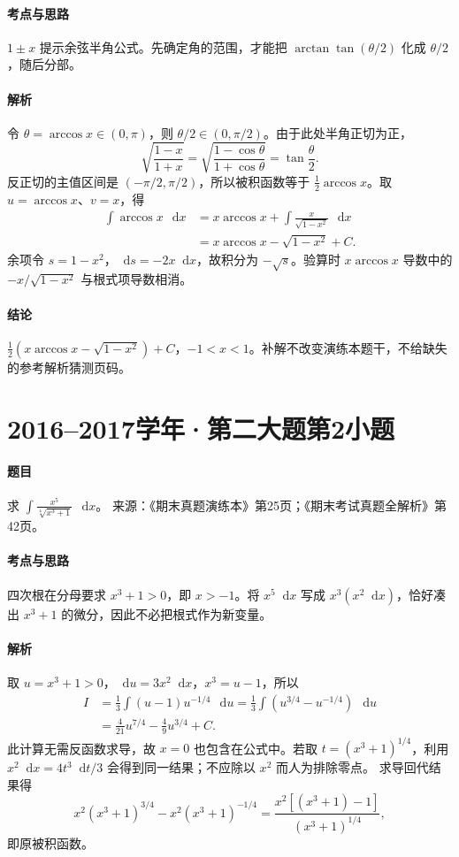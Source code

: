 \documentclass[UTF8,fontset=fandol,12pt,oneside,openany]{ctexrep}
\newcommand{\dd}{\mathop{}\!\mathrm d}
\theoremstyle{definition}
\begin{document}
\paragraph{考点与思路}$1\pm x$ 提示余弦半角公式。先确定角的范围，才能把 $\arctan\tan(\theta/2)$ 化成 $\theta/2$，随后分部。
\paragraph{解析}令 $\theta=\arccos x\in(0,\pi)$，则 $\theta/2\in(0,\pi/2)$。由于此处半角正切为正，
\[
\sqrt{\frac{1-x}{1+x}}
=\sqrt{\frac{1-\cos\theta}{1+\cos\theta}}
=\tan\frac\theta2.
\]
反正切的主值区间是 $(-\pi/2,\pi/2)$，所以被积函数等于 $\frac12\arccos x$。取 $u=\arccos x$、$v=x$，得
\begin{align*}
\int\arccos x\,\dd x
&=x\arccos x+\int\frac{x}{\sqrt{1-x^2}}\,\dd x\\
&=x\arccos x-\sqrt{1-x^2}+C.
\end{align*}
余项令 $s=1-x^2$，$\dd s=-2x\dd x$，故积分为 $-\sqrt{s}$。验算时 $x\arccos x$ 导数中的 $-x/\sqrt{1-x^2}$ 与根式项导数相消。
\paragraph{结论}$\boxed{\frac12\left(x\arccos x-\sqrt{1-x^2}\right)+C}$，$-1<x<1$。补解不改变演练本题干，不给缺失的参考解析猜测页码。

\par\addvspace{18pt}\noindent\begin{minipage}{\linewidth}
\section{2016--2017学年·第二大题第2小题}
\paragraph{题目}求 $\displaystyle\int\frac{x^5}{\sqrt[4]{x^3+1}}\,\dd x$。
来源：《期末真题演练本》第25页；《期末考试真题全解析》第42页。
\end{minipage}\par
\paragraph{考点与思路}四次根在分母要求 $x^3+1>0$，即 $x>-1$。将 $x^5\dd x$ 写成 $x^3(x^2\dd x)$，恰好凑出 $x^3+1$ 的微分，因此不必把根式作为新变量。
\paragraph{解析}取 $u=x^3+1>0$，$\dd u=3x^2\dd x$，$x^3=u-1$，所以
\begin{align*}
I&=\frac13\int(u-1)u^{-1/4}\,\dd u
=\frac13\int(u^{3/4}-u^{-1/4})\,\dd u\\
&=\frac4{21}u^{7/4}-\frac49u^{3/4}+C.
\end{align*}
此计算无需反函数求导，故 $x=0$ 也包含在公式中。若取 $t=(x^3+1)^{1/4}$，利用 $x^2\dd x=4t^3\dd t/3$ 会得到同一结果；不应除以 $x^2$ 而人为排除零点。
求导回代结果得
\[
x^2(x^3+1)^{3/4}-x^2(x^3+1)^{-1/4}
=\frac{x^2[(x^3+1)-1]}{(x^3+1)^{1/4}},
\]
即原被积函数。
\end{document}
